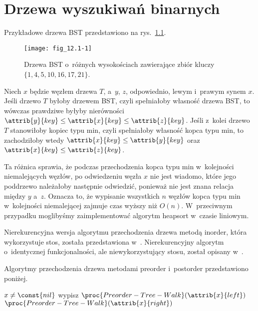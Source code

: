 \chapter{Drzewa wyszukiwań binarnych}


\exercise %
Przykładowe drzewa BST przedstawiono na rys.\ \ref{fig:12.1-1}.
\begin{figure}[ht]
	\begin{center}
		\texttt{[image: fig\_12.1-1]}
	\end{center}
	\caption{Drzewa BST o~różnych wysokościach zawierające zbiór kluczy $\{1,4,5,10,16,17,21\}$.} \label{fig:12.1-1}
\end{figure}

\exercise %

\noindent Niech $x$ będzie węzłem drzewa $T$, a~$y$, $z$, odpowiednio, lewym i~prawym synem $x$.
Jeśli drzewo $T$ byłoby drzewem BST, czyli spełniałoby własność drzewa BST, to wówczas prawdziwe byłyby nierówności $\attrib{y}{key}\le\attrib{x}{key}\le\attrib{z}{key}$.
Jeśli z~kolei drzewo $T$ stanowiłoby kopiec typu min, czyli spełniałoby własność kopca typu min, to zachodziłoby wtedy $\attrib{x}{key}\le\attrib{y}{key}$ oraz $\attrib{x}{key}\le\attrib{z}{key}$.

Ta różnica sprawia, że podczas przechodzenia kopca typu min w~kolejności niemalejących węzłów, po odwiedzeniu węzła $x$ nie jest wiadomo, które jego poddrzewo należałoby następnie odwiedzić, ponieważ nie jest znana relacja między $y$ a~$z$.
Oznacza to, że wypisanie wszystkich $n$ węzłów kopca typu min w~kolejności niemalejącej zajmuje czas wyższy niż $O(n)$.
W~przeciwnym przypadku moglibyśmy zaimplementować algorytm heapsort w~czasie liniowym.

\exercise %
Nierekurencyjna wersja algorytmu przechodzenia drzewa metodą inorder, która wykorzystuje stos, została przedstawiona w~.
Nierekurencyjny algorytm o~identycznej funkcjonalności, ale niewykorzystujący stosu, został opisany w~.

\exercise %
Algorytmy przechodzenia drzewa metodami preorder i~postorder przedstawiono poniżej.

\begin{codebox}
\li	\If $x\ne\const{nil}$
\li		\Then
			wypisz 
\li			$\proc{Preorder-Tree-Walk}(\attrib{x}{left})$
\li			$\proc{Preorder-Tree-Walk}(\attrib{x}{right})$
		\End
\end{codebox}

